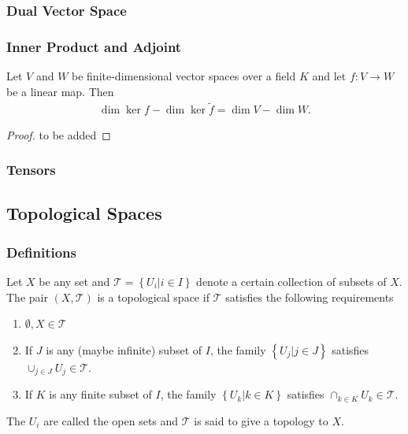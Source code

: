\documentclass[10pt]{article}
\begin{document}
\subsubsection{Dual Vector Space}

\subsubsection{Inner Product and Adjoint}
\begin{theorem}
    Let $V$ and $W$ be finite-dimensional vector spaces over a field $K$ and let $f:V\to W$ be a linear map.
    Then
    \begin{align}
        \dim\ker f-\dim\ker\tilde{f}=\dim V-\dim W.
    \end{align}
\end{theorem}
\begin{proof}
    to be added
\end{proof}

\subsubsection{Tensors}

\subsection{Topological Spaces}
\subsubsection{Definitions}
\begin{definition}
    Let $X$ be any set and $\mathcal{T}=\left\{U_i\vert i\in I\right\}$ denote a certain collection of subsets of $X$.
    The pair $(X,\mathcal{T})$ is a topological space if $\mathcal{T}$ satisfies the following requirements
    \begin{enumerate}
        \item $\emptyset,X\in\mathcal{T}$
        \item If $J$ is any (maybe infinite) subset of $I$, the family $\left\{U_j\vert j\in J\right\}$ satisfies $\cup_{j\in J}U_j\in \mathcal{T}$.
        \item If $K$ is any finite subset of $I$, the family $\left\{U_k\vert k\in K\right\}$ satisfies $\cap_{k\in K}U_k\in\mathcal{T}$.
    \end{enumerate}
    The $U_i$ are called the open sets and $\mathcal{T}$ is said to give a topology to $X$.
\end{definition}
\end{document}
